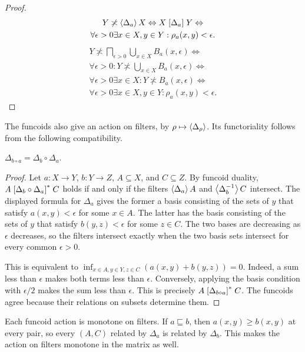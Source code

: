 \begin{proof}
\begin{multline*}
Y\not\asymp\left\langle \Delta_a\right\rangle X\Leftrightarrow X\mathrel{\left[\Delta_a\right]}Y \Leftrightarrow \\ \forall\epsilon>0\exists x\in X,y\in Y:\rho_a(x,y)<\epsilon.
\end{multline*}
\begin{multline*}
Y\nasymp\bigsqcap_{\epsilon>0}\bigcup_{x\in X}B_a(x,\epsilon) \Leftrightarrow \\ \forall\epsilon>0:Y\nasymp\bigcup_{x\in X}B_a(x,\epsilon) \Leftrightarrow \\
\forall\epsilon>0\exists x\in X:Y\nasymp B_a(x,\epsilon) \Leftrightarrow \\
\forall\epsilon>0\exists x\in X,y\in Y:\rho_a(x,y)<\epsilon.
\end{multline*}
\end{proof}

The funcoids also give an action on filters, by
$\rho\mapsto\left\langle \Delta_\rho\right\rangle$. Its functoriality follows from the
following compatibility.

\begin{lem}
$\Delta_{b\circ a}=\Delta_b\circ\Delta_a$.
\end{lem}

\begin{proof}
Let $a:X\to Y$, $b:Y\to Z$, $A\subseteq X$, and $C\subseteq Z$.
By funcoid duality, $A\mathrel{\left[\Delta_b\circ\Delta_a\right]^{\ast}} C$ holds if and
only if the filters $\left\langle \Delta_a\right\rangle A$ and
$\left\langle \Delta_b^{-1}\right\rangle C$ intersect. The displayed formula for
$\Delta_a$ gives the former a basis consisting of the sets of
$y$ that satisfy $a(x,y)<\epsilon$ for some $x\in A$.
The latter has the basis consisting of the sets of $y$ that satisfy
$b(y,z)<\epsilon$ for some $z\in C$. The two bases are decreasing as
$\epsilon$ decreases, so the filters intersect exactly when the two
basis sets intersect for every common $\epsilon>0$.

This is equivalent to
$\inf_{x\in A,y\in Y,z\in C}(a(x,y)+b(y,z))=0$.
Indeed, a sum less than $\epsilon$ makes both terms less than
$\epsilon$. Conversely, applying the basis condition with
$\epsilon/2$ makes the sum less than $\epsilon$.
This is precisely $A\mathrel{\left[\Delta_{b\circ a}\right]^{\ast}}C$.
The funcoids agree because their relations on subsets determine them.
\end{proof}

Each funcoid action is monotone on filters. If $a\sqsubseteq b$, then
$a(x,y)\ge b(x,y)$ at every pair, so every $(A,C)$ related by
$\Delta_a$ is related by $\Delta_b$. This makes the action on filters
monotone in the matrix as well.

